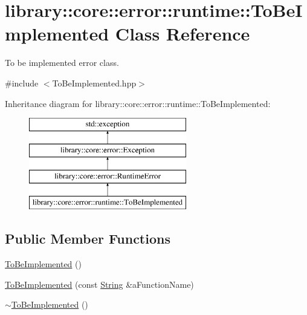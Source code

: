 \hypertarget{classlibrary_1_1core_1_1error_1_1runtime_1_1_to_be_implemented}{}\section{library\+::core\+::error\+::runtime\+::To\+Be\+Implemented Class Reference}
\label{classlibrary_1_1core_1_1error_1_1runtime_1_1_to_be_implemented}


To be implemented error class.  




{\ttfamily \#include $<$To\+Be\+Implemented.\+hpp$>$}

Inheritance diagram for library\+::core\+::error\+::runtime\+::To\+Be\+Implemented\+:\begin{figure}[H]
\begin{center}
\leavevmode
\includegraphics[height=4.000000cm]{classlibrary_1_1core_1_1error_1_1runtime_1_1_to_be_implemented}
\end{center}
\end{figure}
\subsection*{Public Member Functions}
\begin{DoxyCompactItemize}
\item 
\mbox{\hyperlink{classlibrary_1_1core_1_1error_1_1runtime_1_1_to_be_implemented_aa98b3ae5c0ee3329a09b4b03bf27cf85}{To\+Be\+Implemented}} ()
\item 
\mbox{\hyperlink{classlibrary_1_1core_1_1error_1_1runtime_1_1_to_be_implemented_aee7854f221ff5bdade9cb8d67267b6ba}{To\+Be\+Implemented}} (const \mbox{\hyperlink{classlibrary_1_1core_1_1types_1_1_string}{String}} \&a\+Function\+Name)
\item 
\mbox{\hyperlink{classlibrary_1_1core_1_1error_1_1runtime_1_1_to_be_implemented_a4d6d8204b46f1f5eb41458849a891787}{$\sim$\+To\+Be\+Implemented}} ()
\end{DoxyCompactItemize}


